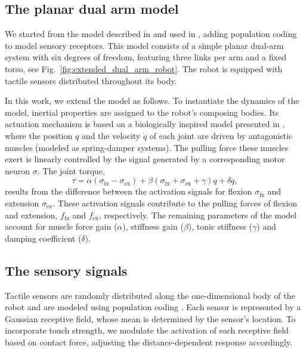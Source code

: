 \documentclass[letterpaper, 10 pt, conference]{ieeeconf}  %
\begin{document}
\subsection{The planar dual arm model}
We started from the model described in \cite{Mannella2018Knowyourbody} and used in \cite{Marcel2022Learningreachown}, adding population coding to model sensory receptors. This model consists of a simple planar dual-arm system with six degrees of freedom, featuring three links per arm and a fixed torso, see Fig.~\ref{fig:extended_dual_arm_robot}. The robot is equipped with tactile sensors distributed throughout its body. 

In this work, we extend the model as follows. 
To instantiate the dynamics of the model, inertial properties are assigned to the robot's composing bodies. Its actuation mechanism is based on a biologically inspired model presented in \cite{Shim2012Chaoticexplorationlearning}, where the position $q$ and the velocity $\dot{q}$ of each joint are driven by antagonistic muscles (modeled as spring-damper systems). The pulling force these muscles exert is linearly controlled by the signal generated by a corresponding motor neuron $\sigma$. The joint torque,
\begin{equation}\label{eq:antagonistic_torque}
	\tau = \alpha \left(\sigma_\mathrm{fx} - \sigma_\mathrm{ex}\right)  + \beta \left(\sigma_\mathrm{fx} + \sigma_\mathrm{ex} + \gamma \right) q + \delta \dot{q},
\end{equation}
results from the difference between the activation signals for flexion $ \sigma_\mathrm{fx} $ and extension $\sigma_\mathrm{ex}$. These activation signals contribute to the pulling forces of flexion and extension, $ f_\mathrm{fx}$ and $f_\mathrm{ex} $, respectively. The remaining parameters of the model account for muscle force gain ($\alpha$), stiffness gain ($\beta$), tonic stiffness ($\gamma$) and damping coefficient ($\delta$).

\subsection{The sensory signals}
Tactile sensors are randomly distributed along the one-dimensional body of the robot and are modeled using population coding \cite{Panzeri2010PopulationCoding}. Each sensor is represented by a Gaussian receptive field, whose mean is determined by the sensor's location. To incorporate touch strength, we modulate the activation of each receptive field based on contact force, adjusting the distance-dependent response accordingly.  
\end{document}
